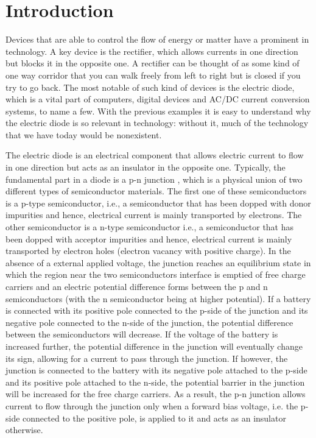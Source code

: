 
\chapter*{Introduction} %
\label{Introduction}

Devices that are able to control the flow of energy or matter have a prominent in technology. A key device is the rectifier, which allows currents in one direction but blocks it in the opposite one. A rectifier can be thought of as some kind of one way corridor that you can walk freely from left to right but is closed if you try to go back. The most notable of such kind of devices is the electric diode, which is a vital part of computers, digital devices and AC/DC current conversion systems, to name a few. With the previous examples it is easy to understand why the electric diode is so relevant in technology: without it, much of the technology that we have today would be nonexistent.

The electric diode is an electrical component that allows electric current to flow in one direction but acts as an insulator in the opposite one. Typically, the fundamental part in a diode is a p-n junction \cite{Neamen2003}, which is a physical union of two different types of semiconductor materials. The first one of these semiconductors is a p-type semiconductor, i.e., a semiconductor that has been dopped with donor impurities and hence, electrical current is mainly transported by electrons. The other semiconductor is a n-type semiconductor i.e., a semiconductor that has been dopped with acceptor impurities and hence, electrical current is mainly transported by electron holes (electron vacancy with positive charge). In the absence of a external applied voltage, the junction reaches an equilibrium state in which the region near the two semiconductors interface is emptied of free charge carriers and an electric potential difference forms between the p and n semiconductors (with the n semiconductor being at higher potential). If a battery is connected with its positive pole connected to the p-side of the junction and its negative pole connected to the n-side of the junction, the potential difference between the semiconductors will decrease. If the voltage of the battery is increased further, the potential difference in the junction will eventually change its sign, allowing for a current to pass through the junction. If however, the junction is connected to the battery with its negative pole attached to the p-side and its positive pole attached to the n-side, the potential barrier in the junction will be increased for the free charge carriers. As a result, the p-n junction allows current to flow through the junction only when a forward bias voltage, i.e. the p-side connected to the positive pole, is applied to it and acts as an insulator otherwise.

